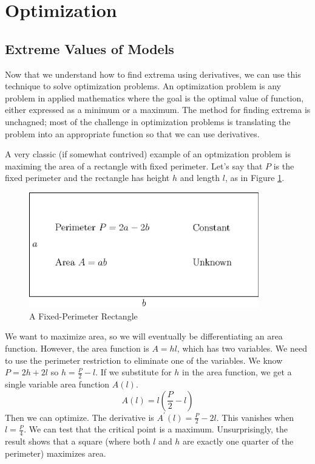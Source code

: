 \documentclass[fleqn]{report}
\begin{document}
\section{Optimization}
\label{optimization}

\subsection{Extreme Values of Models}
\label{models-exterem-values}

Now that we understand how to find extrema using derivatives,
we can use this technique to solve optimization problems.  An
optimization problem is any problem in applied mathematics
where the goal is the optimal value of function, either
expressed as a minimum or a maximum. The method for finding
extrema is unchagned; most of the challenge in optimization
problems is translating the problem into an appropriate
function so that we can use derivatives.

\begin{example}
A very classic (if somewhat contrived) example of an
optmization problem is maximing the area of a rectangle with
fixed perimeter. Let's say that $P$ is the fixed perimeter and
the rectangle has height $h$ and length $l$, as in Figure
\ref{figure-fixed-perimeter-rectangle}.

\begin{figure}[ht]
\centering
\includegraphics[width=10cm]{figure56.eps}
\caption{A Fixed-Perimeter Rectangle}
\label{figure-fixed-perimeter-rectangle}
\end{figure}

We want to maximize area, so we will eventually be
differentiating an area function. However, the area function
is $A = hl$, which has two variables. We need to
use the perimeter restriction to eliminate one of the
variables. We know $P = 2h + 2l$ so $h = \frac{P}{2} - l$.
If we substitute for $h$ in the area function, we get a single
variable area function $A(l)$.
\begin{equation*}
A(l) = l \left( \frac{P}{2} - l \right)
\end{equation*}
Then we can optimize. The derivative is $A^\prime(l) =
\frac{P}{2} - 2l$. This vanishes when $l = \frac{P}{4}$. We
can test that the critical point is a maximum. Unsurprisingly,
the result shows that a square (where both $l$ and $h$ are
exactly one quarter of the perimeter) maximizes area.
\end{example}
\end{document}

